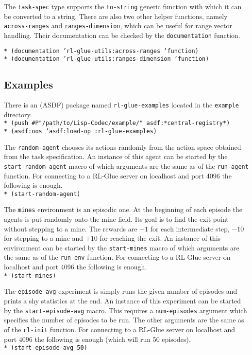 \documentclass[11pt,a4paper,dvipdfm]{article}
\newcommand{\prompttext}[1]{\texttt{#1}}
\newcommand{\lispprompt}[1]{\prompttext{* #1}}
\begin{document}
The \prompttext{task-spec} type supports the \prompttext{to-string} generic
function with which it can be converted to a string. There are also two other
helper functions, namely \prompttext{across-ranges} and
\prompttext{ranges-dimension}, which can be useful for range vector handling.
Their documentation can be checked by the \prompttext{documentation} function.

\lispprompt{(documentation 'rl-glue-utils:across-ranges 'function)} \\
\lispprompt{(documentation 'rl-glue-utils:ranges-dimension 'function)}

\hypertarget{examples}{\subsection{Examples}}

There is an (ASDF) package named \prompttext{rl-glue-examples} located
in the \prompttext{example} directory. \\
\lispprompt{(push \#P"/path/to/Lisp-Codec/example/" asdf:*central-registry*)} \\
\lispprompt{(asdf:oos 'asdf:load-op :rl-glue-examples)}

The \prompttext{random-agent} chooses its actions randomly from the action
space obtained from the task specification. An instance of this agent can be
started by the \prompttext{start-random-agent} macro of which arguments are the
same as of the \prompttext{run-agent} function. For connecting to a RL-Glue
server on localhost and port 4096 the following is enough. \\
\lispprompt{(start-random-agent)}

The \prompttext{mines} environment is an episodic one. At the beginning of
each episode the agents is put randomly onto the mine field. Its goal is to
find the exit point without stepping to a mine. The rewards are $-1$ for each
intermediate step, $-10$ for stepping to a mine and $+10$ for reaching the exit.
An instance of this environment can be started by the \prompttext{start-mines}
macro of which arguments are the same as of the \prompttext{run-env} function.
For connecting to a RL-Glue server on localhost and port 4096 the following is
enough. \\
\lispprompt{(start-mines)}

The \prompttext{episode-avg} experiment is simply runs the given number of
episodes and prints a shy statistics at the end. An instance of this
experiment can be started by the \prompttext{start-episode-avg} macro. This
requires a \prompttext{num-episodes} argument which specifies the number of
episodes to be run. The other arguments are the same as of the
\prompttext{rl-init} function. For connecting to a RL-Glue server on localhost
and port 4096 the following is enough (which will run 50 episodes). \\
\lispprompt{(start-episode-avg 50)}
\end{document}
